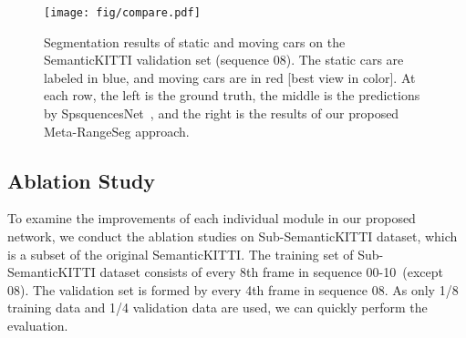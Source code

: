 \documentclass[letterpaper, 10 pt, journal, twoside]{ieeetran}
\begin{document}
\begin{figure*}
\setlength{\abovecaptionskip}{-0.3cm}
 \centering
\texttt{[image: fig/compare.pdf]}
    \caption{Segmentation results of static and moving cars on the SemanticKITTI validation set (sequence 08). The static cars are labeled in blue, and moving cars are in red [best view in color]. At each row, the left is the ground truth, the middle is the predictions by SpsquencesNet~\cite{shi2020spsequencenet}, and the right is the results of our proposed Meta-RangeSeg approach.}
    \label{fig:seventh}
    \vspace{-4mm}
\end{figure*}

\subsection{Ablation Study}
To examine the improvements of each individual module in our proposed network, we conduct the ablation studies on Sub-SemanticKITTI dataset, which is a subset of the original SemanticKITTI. The training set of Sub-SemanticKITTI dataset consists of every 8th frame in sequence 00-10~(except 08). The validation set is formed by every 4th frame in sequence 08. As only 1/8 training data and 1/4 validation data are used, we can quickly perform the evaluation. 
\end{document}
